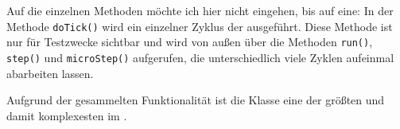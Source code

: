 Auf die einzelnen Methoden möchte ich hier nicht eingehen, bis auf eine: In der Methode \texttt{doTick()} wird ein einzelner Zyklus der \mic ausgeführt. Diese Methode ist nur für Testzwecke sichtbar und wird von außen über die Methoden \texttt{run()}, \texttt{step()} und \texttt{microStep()} aufgerufen, die unterschiedlich viele Zyklen aufeinmal abarbeiten lassen.

Aufgrund der gesammelten Funktionalität ist die Klasse  eine der größten und damit komplexesten im \md.